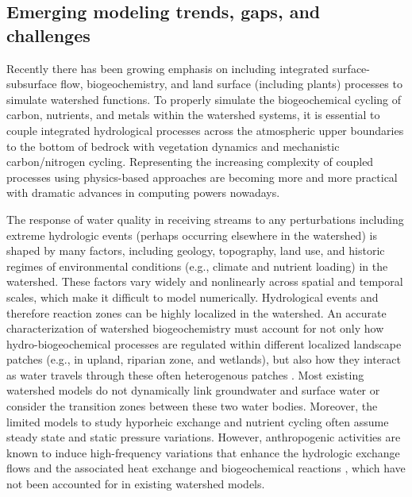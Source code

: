 \documentclass[preprint,review, 12pt]{elsarticle}
\begin{document}
\subsection{Emerging modeling trends, gaps, and challenges}

 Recently there has been growing emphasis on including integrated surface-subsurface flow, biogeochemistry, and land surface (including plants) processes to simulate watershed functions. To properly simulate the biogeochemical cycling of carbon, nutrients, and metals within the watershed systems, it is essential to couple integrated hydrological processes across the atmospheric upper boundaries to the bottom of bedrock with vegetation dynamics and mechanistic carbon/nitrogen cycling. Representing the increasing complexity of coupled processes using physics-based approaches are becoming more and more practical with dramatic advances in computing powers nowadays.  
 
 The response of water quality in receiving streams to any perturbations including extreme hydrologic events (perhaps occurring elsewhere in the watershed) is shaped by many factors, including geology, topography, land use, and historic regimes of environmental conditions (e.g., climate and nutrient loading) in the watershed. These factors vary widely and nonlinearly across spatial and temporal scales, which make it difficult to model numerically. Hydrological events \citep{Lu2017a} and therefore reaction zones \citep{McClain2003} can be highly localized in the watershed. An accurate characterization of watershed biogeochemistry must account for not only how hydro-biogeochemical processes are regulated within different localized landscape patches (e.g., in upland, riparian zone, and wetlands), but also how they interact as water travels through these often heterogenous patches \citep{Laudon2018b}. Most existing watershed models do not dynamically link groundwater and surface water or consider the transition zones between these two water bodies. Moreover, the limited models to study hyporheic exchange and nutrient cycling often assume steady state and static pressure variations. However, anthropogenic activities are known to induce high-frequency variations that enhance the hydrologic exchange flows and the associated heat exchange and biogeochemical reactions \citep{Shuai2019b,Song2018b}, which have not been accounted for in existing watershed models.
    
\end{document}
